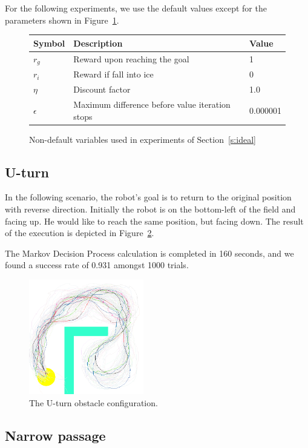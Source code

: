 \documentclass[a4paper]{article}
\begin{document}
For the following experiments, we use the default values except for the
parameters shown in Figure~\ref{f:idealparam}.

\begin{figure}
  \caption{Non-default variables used in experiments of Section~\ref{s:ideal}}
\label{f:idealparam}
\begin{tabular}{ l | l | l }
  Symbol & Description & Value \\ \hline \hline
  $r_g$ & Reward upon reaching the goal & 1 \\ \hline
  $r_i$ & Reward if fall into ice & 0 \\ \hline
  $\eta$ & Discount factor & 1.0 \\ \hline
  $\epsilon$ & Maximum difference before value iteration stops & 0.000001 \\ \hline
\end{tabular}
\end{figure}

\subsection{U-turn}

In the following scenario, the robot's goal is to return to the original position
with reverse direction. Initially the robot is on the bottom-left of the field
and facing up. He would like to reach the same position, but facing down.
The result of the execution is depicted in Figure~\ref{f:uturn}.

The Markov Decision Process calculation is completed in 160 seconds,
and we found a success rate of 0.931 amongst 1000 trials.

\begin{figure}
\caption{The U-turn obstacle configuration.}
\label{f:uturn}
\centerline{\includegraphics[width=5cm]{uturn.png}}
\end{figure}

\subsection{Narrow passage}
\end{document}
